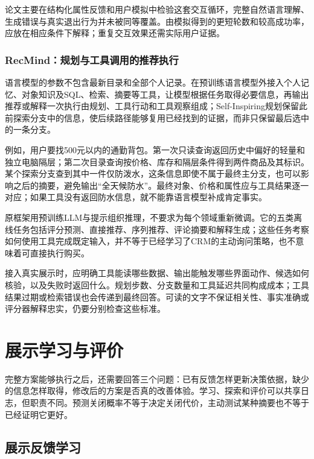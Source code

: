 论文主要在结构化属性反馈和用户模拟中检验这套交互循环，完整自然语言理解、生成错误与真实退出行为并未被同等覆盖。由模拟得到的更短轮数和较高成功率，应放在相应条件下解释；重复交互效果还需实际用户证据。

\subsubsection{RecMind：规划与工具调用的推荐执行}
\label{sec:rs-recmind}

语言模型的参数不包含最新目录和全部个人记录。在预训练语言模型外接入个人记忆、对象知识及SQL、检索、摘要等工具，让模型根据任务取得必要信息，再输出推荐或解释一次执行由规划、工具行动和工具观察组成；Self-Inspiring规划保留此前探索分支中的信息，使后续路径能够复用已经找到的证据，而非只保留最后选中的一条分支。

例如，用户要找500元以内的通勤背包。第一次只读查询返回历史中偏好的轻量和独立电脑隔层；第二次目录查询按价格、库存和隔层条件得到两件商品及其标识。某个探索分支查到其中一件仅防泼水，这条信息即使不属于最终主分支，也可以影响之后的摘要，避免输出“全天候防水”。最终对象、价格和属性应与工具结果逐一对应；如果工具没有返回防水信息，就不能靠语言模型补成肯定事实。

原框架用预训练LLM与提示组织推理，不要求为每个领域重新微调。它的五类离线任务包括评分预测、直接推荐、序列推荐、评论摘要和解释生成；这些任务考察如何使用工具完成既定输入，并不等于已经学习了CRM的主动询问策略，也不意味着可直接执行购买。

接入真实展示时，应明确工具能读哪些数据、输出能触发哪些界面动作、候选如何核验，以及失败时返回什么。规划步数、分支数量和工具延迟共同构成成本；工具结果过期或检索错误也会传递到最终回答。可读的文字不保证相关性、事实准确或评分器解释忠实，仍要分别检查这些标准。

\section{展示学习与评价}
\label{sec:rs-presentation-learning}

完整方案能够执行之后，还需要回答三个问题：已有反馈怎样更新决策依据，缺少的信息怎样取得，修改后的方案是否真的改善体验。学习、探索和评价可以共享日志，但职责不同。预测关闭概率不等于决定关闭代价，主动测试某种摘要也不等于已经证明它更好。

\subsection{展示反馈学习}
\label{sec:rs-display-feedback}

